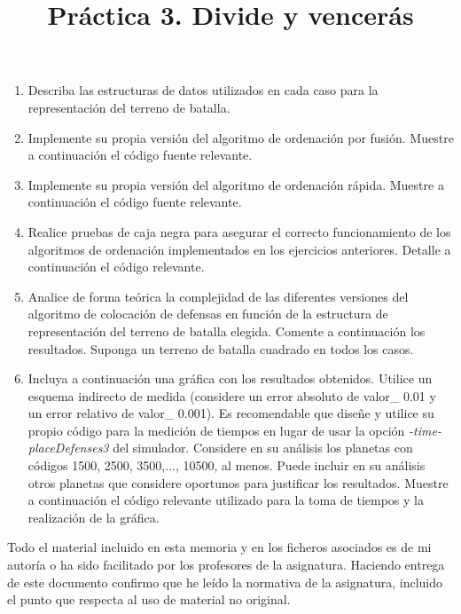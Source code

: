 \documentclass[]{article}
\title{Práctica 3. Divide y vencerás}
\author{}
\begin{document}
\maketitle


%

\begin{enumerate}
\item Describa las estructuras de datos utilizados en cada caso para la representación del terreno de batalla. 



\item Implemente su propia versión del algoritmo de ordenación por fusión. Muestre a continuación el código fuente relevante. 




\item Implemente su propia versión del algoritmo de ordenación rápida. Muestre a continuación el código fuente relevante. 



\item Realice pruebas de caja negra para asegurar el correcto funcionamiento de los algoritmos de ordenación implementados en los ejercicios anteriores. Detalle a continuación el código relevante.



\item Analice de forma teórica la complejidad de las diferentes versiones del algoritmo de colocación de defensas en función de la estructura de representación del terreno de batalla elegida. Comente a continuación los resultados. Suponga un terreno de batalla cuadrado en todos los casos. 



\item Incluya a continuación una gráfica con los resultados obtenidos. Utilice un esquema indirecto de medida (considere un error absoluto de valor_ 0.01 y un error relativo de valor_ 0.001). Es recomendable que diseñe y utilice su propio código para la medición de tiempos en lugar de usar la opción \emph{-time-placeDefenses3} del simulador. Considere en su análisis los planetas con códigos 1500, 2500, 3500,..., 10500, al menos. Puede incluir en su análisis otros planetas que considere oportunos para justificar los resultados. Muestre a continuación el código relevante utilizado para la toma de tiempos y la realización de la gráfica.



\end{enumerate}

Todo el material incluido en esta memoria y en los ficheros asociados es de mi autoría o ha sido facilitado por los profesores de la asignatura. Haciendo entrega de este documento confirmo que he leído la normativa de la asignatura, incluido el punto que respecta al uso de material no original.
\end{document}
